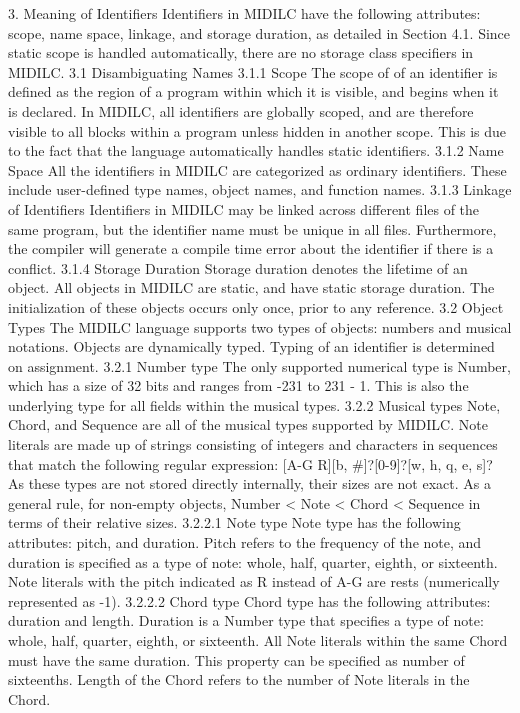 \documentclass[12pt,A4]{book}
\begin{document}
3. Meaning of Identifiers
Identifiers in MIDILC have the following attributes: scope, name space, linkage, and storage duration, as detailed in Section 4.1. Since static scope is handled automatically, there are no storage class specifiers in MIDILC.
3.1 Disambiguating Names
3.1.1 Scope
The scope of of an identifier is defined as the region of a program within which it is visible, and begins when it is declared. In MIDILC, all identifiers are globally scoped, and are therefore visible to all blocks within a program unless hidden in another scope. This is due to the fact that the language automatically handles static identifiers.
3.1.2 Name Space
All the identifiers in MIDILC are categorized as ordinary identifiers. These include user-defined type names, object names, and function names.
3.1.3 Linkage of Identifiers
Identifiers in MIDILC may be linked across different files of the same program, but the identifier name must be unique in all files. Furthermore, the compiler will generate a compile time error about the identifier if there is a conflict.
3.1.4 Storage Duration
Storage duration denotes the lifetime of an object. All objects in MIDILC are static, and have static storage duration. The initialization of these objects occurs only once, prior to any reference.
3.2 Object Types
The MIDILC language supports two types of objects: numbers and musical notations.  Objects are dynamically typed.  Typing of an identifier is determined on assignment.
3.2.1 Number type
The only supported numerical type is Number, which has a size of 32 bits and ranges from -231 to 231 - 1.  This is also the underlying type for all fields within the musical types.
3.2.2 Musical types
Note, Chord, and Sequence are all of the musical types supported by MIDILC. Note literals are  made up of strings consisting of integers and characters in sequences that match the following regular expression:
[A-G R][b, #]?[0-9]?[w, h, q, e, s]?
As these types are not stored directly internally, their sizes are not exact. As a general rule, for non-empty objects,
Number < Note < Chord < Sequence in terms of their relative sizes.
3.2.2.1 Note type
Note type has the following attributes: pitch, and duration. Pitch refers to the frequency of the note, and duration is specified as a type of note: whole, half, quarter, eighth, or sixteenth.  Note literals with the pitch indicated as R instead of A-G are rests (numerically represented as -1).
3.2.2.2 Chord type
Chord type has the following attributes: duration and length. Duration is a Number type that specifies a type of note: whole, half, quarter, eighth, or sixteenth. All Note literals within the same Chord must have the same duration.  This property can be specified as number of sixteenths. Length of the Chord refers to the number of Note literals in the Chord.
\end{document}
